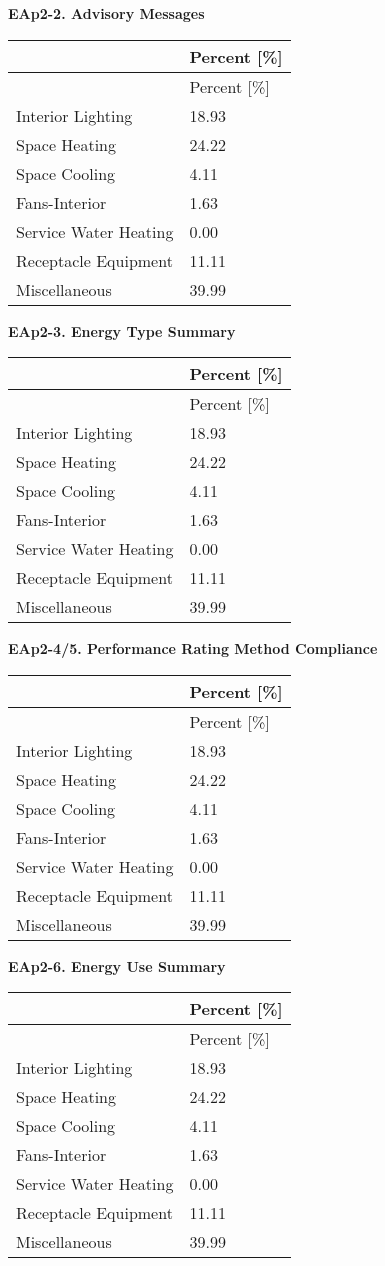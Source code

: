 \textbf{EAp2-2. Advisory Messages}

\begin{longtable}[c]{@{}ll@{}}
\toprule 
 & Percent [\%] \tabularnewline
\midrule
\endfirsthead

\toprule 
 & Percent [\%] \tabularnewline
\midrule
\endhead

Interior Lighting & 18.93 \tabularnewline
Space Heating & 24.22 \tabularnewline
Space Cooling & 4.11 \tabularnewline
Fans-Interior & 1.63 \tabularnewline
Service Water Heating & 0.00 \tabularnewline
Receptacle Equipment & 11.11 \tabularnewline
Miscellaneous & 39.99 \tabularnewline
\bottomrule
\end{longtable}

\textbf{EAp2-3. Energy Type Summary}

\begin{longtable}[c]{@{}ll@{}}
\toprule 
 & Percent [\%] \tabularnewline
\midrule
\endfirsthead

\toprule 
 & Percent [\%] \tabularnewline
\midrule
\endhead

Interior Lighting & 18.93 \tabularnewline
Space Heating & 24.22 \tabularnewline
Space Cooling & 4.11 \tabularnewline
Fans-Interior & 1.63 \tabularnewline
Service Water Heating & 0.00 \tabularnewline
Receptacle Equipment & 11.11 \tabularnewline
Miscellaneous & 39.99 \tabularnewline
\bottomrule
\end{longtable}

\textbf{EAp2-4/5. Performance Rating Method Compliance}

\begin{longtable}[c]{@{}ll@{}}
\toprule 
 & Percent [\%] \tabularnewline
\midrule
\endfirsthead

\toprule 
 & Percent [\%] \tabularnewline
\midrule
\endhead

Interior Lighting & 18.93 \tabularnewline
Space Heating & 24.22 \tabularnewline
Space Cooling & 4.11 \tabularnewline
Fans-Interior & 1.63 \tabularnewline
Service Water Heating & 0.00 \tabularnewline
Receptacle Equipment & 11.11 \tabularnewline
Miscellaneous & 39.99 \tabularnewline
\bottomrule
\end{longtable}

\textbf{EAp2-6. Energy Use Summary}

\begin{longtable}[c]{@{}ll@{}}
\toprule 
 & Percent [\%] \tabularnewline
\midrule
\endfirsthead

\toprule 
 & Percent [\%] \tabularnewline
\midrule
\endhead

Interior Lighting & 18.93 \tabularnewline
Space Heating & 24.22 \tabularnewline
Space Cooling & 4.11 \tabularnewline
Fans-Interior & 1.63 \tabularnewline
Service Water Heating & 0.00 \tabularnewline
Receptacle Equipment & 11.11 \tabularnewline
Miscellaneous & 39.99 \tabularnewline
\bottomrule
\end{longtable}

